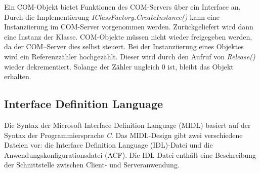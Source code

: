 Ein COM-Objekt bietet Funktionen des COM-Servers über ein Interface an. Durch die Implementierung \textit{IClassFactory.CreateInstance()} kann eine Instanziierung im COM-Server vorgenommen werden. Zurückgeliefert wird dann eine Instanz der Klasse. COM-Objekte müssen nicht wieder freigegeben werden, da der COM–Server dies selbst steuert. Bei der Instanziierung eines Objektes  wird ein Referenzzähler hochgezählt. Dieser wird durch den Aufruf von \textit{Release()} wieder dekrementiert. Solange der Zähler ungleich 0 ist, bleibt das Objekt erhalten. 

\subsection{Interface Definition Language}
\label{ch:grundlagen:sec:ComponentObjectModel:subsec:InterfaceDefinitionLanguage}

Die Syntax der Microsoft Interface Definition Language (MIDL) basiert auf der Syntax der Programmiersprache \textit{C}. Das MIDL-Design gibt zwei verschiedene Dateien vor: die Interface Definition Language (IDL)-Datei und die Anwendungskonfigurationsdatei (ACF). Die IDL-Datei enthält eine Beschreibung der Schnittstelle zwischen Client- und Serveranwendung.